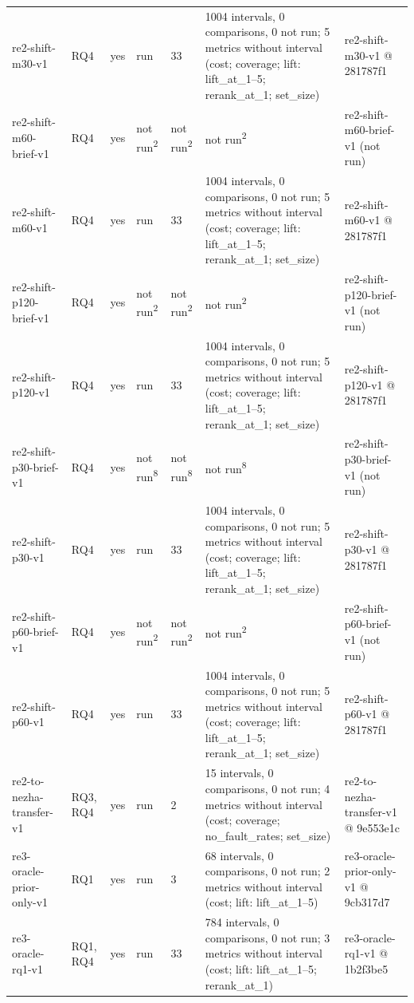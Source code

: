 \begin{table}[t]
\begin{tabular}{lllllll}
re2-shift-m30-v1 & RQ4 & yes & run & 33 & 1004 intervals, 0 comparisons, 0 not run; 5 metrics without interval (cost; coverage; lift: lift\_at\_1--5; rerank\_at\_1; set\_size) & re2-shift-m30-v1 @ 281787f1 \\
re2-shift-m60-brief-v1 & RQ4 & yes & not run\textsuperscript{2} & not run\textsuperscript{2} & not run\textsuperscript{2} & re2-shift-m60-brief-v1 (not run) \\
re2-shift-m60-v1 & RQ4 & yes & run & 33 & 1004 intervals, 0 comparisons, 0 not run; 5 metrics without interval (cost; coverage; lift: lift\_at\_1--5; rerank\_at\_1; set\_size) & re2-shift-m60-v1 @ 281787f1 \\
re2-shift-p120-brief-v1 & RQ4 & yes & not run\textsuperscript{2} & not run\textsuperscript{2} & not run\textsuperscript{2} & re2-shift-p120-brief-v1 (not run) \\
re2-shift-p120-v1 & RQ4 & yes & run & 33 & 1004 intervals, 0 comparisons, 0 not run; 5 metrics without interval (cost; coverage; lift: lift\_at\_1--5; rerank\_at\_1; set\_size) & re2-shift-p120-v1 @ 281787f1 \\
re2-shift-p30-brief-v1 & RQ4 & yes & not run\textsuperscript{8} & not run\textsuperscript{8} & not run\textsuperscript{8} & re2-shift-p30-brief-v1 (not run) \\
re2-shift-p30-v1 & RQ4 & yes & run & 33 & 1004 intervals, 0 comparisons, 0 not run; 5 metrics without interval (cost; coverage; lift: lift\_at\_1--5; rerank\_at\_1; set\_size) & re2-shift-p30-v1 @ 281787f1 \\
re2-shift-p60-brief-v1 & RQ4 & yes & not run\textsuperscript{2} & not run\textsuperscript{2} & not run\textsuperscript{2} & re2-shift-p60-brief-v1 (not run) \\
re2-shift-p60-v1 & RQ4 & yes & run & 33 & 1004 intervals, 0 comparisons, 0 not run; 5 metrics without interval (cost; coverage; lift: lift\_at\_1--5; rerank\_at\_1; set\_size) & re2-shift-p60-v1 @ 281787f1 \\
re2-to-nezha-transfer-v1 & RQ3, RQ4 & yes & run & 2 & 15 intervals, 0 comparisons, 0 not run; 4 metrics without interval (cost; coverage; no\_fault\_rates; set\_size) & re2-to-nezha-transfer-v1 @ 9e553e1c \\
re3-oracle-prior-only-v1 & RQ1 & yes & run & 3 & 68 intervals, 0 comparisons, 0 not run; 2 metrics without interval (cost; lift: lift\_at\_1--5) & re3-oracle-prior-only-v1 @ 9cb317d7 \\
re3-oracle-rq1-v1 & RQ1, RQ4 & yes & run & 33 & 784 intervals, 0 comparisons, 0 not run; 3 metrics without interval (cost; lift: lift\_at\_1--5; rerank\_at\_1) & re3-oracle-rq1-v1 @ 1b2f3be5 \\

\end{tabular}
\end{table}
